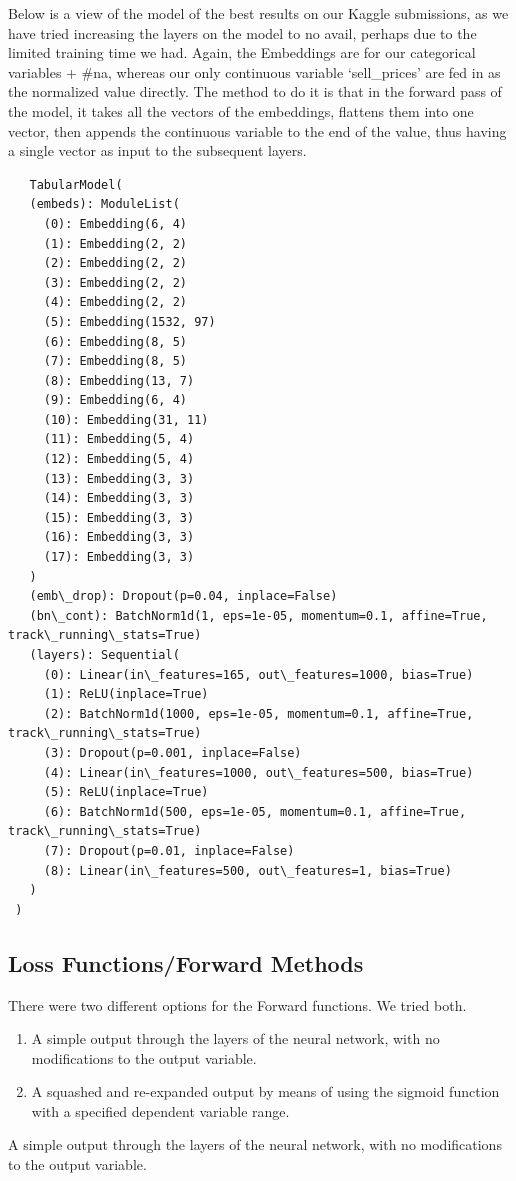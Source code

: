 \documentclass[10pt,twocolumn,letterpaper]{article}
\begin{document}
  Below is a view of the model of the best results on our Kaggle submissions, as
  we have tried increasing the layers on the model to no avail, perhaps due to
  the limited training time we had. Again, the Embeddings are for our
  categorical variables + \#na, whereas our only continuous variable
  ‘sell\_prices' are fed in as the normalized value directly. The method to do it
  is that in the forward pass of the model, it takes all the vectors of the
  embeddings, flattens them into one vector, then appends the continuous
  variable to the end of the value, thus having a single vector as input to the
  subsequent layers.

\begin{verbatim}
   TabularModel(
   (embeds): ModuleList(
     (0): Embedding(6, 4)
     (1): Embedding(2, 2)
     (2): Embedding(2, 2)
     (3): Embedding(2, 2)
     (4): Embedding(2, 2)
     (5): Embedding(1532, 97)
     (6): Embedding(8, 5)
     (7): Embedding(8, 5)
     (8): Embedding(13, 7)
     (9): Embedding(6, 4)
     (10): Embedding(31, 11)
     (11): Embedding(5, 4)
     (12): Embedding(5, 4)
     (13): Embedding(3, 3)
     (14): Embedding(3, 3)
     (15): Embedding(3, 3)
     (16): Embedding(3, 3)
     (17): Embedding(3, 3)
   )
   (emb\_drop): Dropout(p=0.04, inplace=False)
   (bn\_cont): BatchNorm1d(1, eps=1e-05, momentum=0.1, affine=True, track\_running\_stats=True)
   (layers): Sequential(
     (0): Linear(in\_features=165, out\_features=1000, bias=True)
     (1): ReLU(inplace=True)
     (2): BatchNorm1d(1000, eps=1e-05, momentum=0.1, affine=True, track\_running\_stats=True)
     (3): Dropout(p=0.001, inplace=False)
     (4): Linear(in\_features=1000, out\_features=500, bias=True)
     (5): ReLU(inplace=True)
     (6): BatchNorm1d(500, eps=1e-05, momentum=0.1, affine=True, track\_running\_stats=True)
     (7): Dropout(p=0.01, inplace=False)
     (8): Linear(in\_features=500, out\_features=1, bias=True)
   )
 )
\end{verbatim}

\subsection{Loss Functions/Forward Methods}
There were two different options for the Forward functions. We tried both.
\begin{enumerate}
  \item A simple output through the layers of the neural network, with no
  modifications to the output variable.
  \item A squashed and re-expanded output by means of using the sigmoid function
  with a specified dependent variable range.
\end{enumerate}
  A simple output through the layers of the neural network, with no
  modifications to the output variable.
\end{document}
